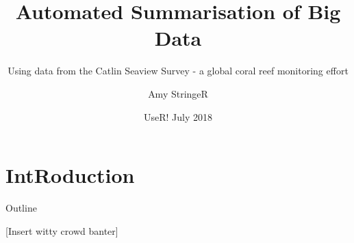\documentclass{beamer}
\title{Automated Summarisation of Big Data}
\subtitle{Using data from the Catlin Seaview Survey - a global coral reef monitoring effort}
\author{Amy StringeR}
\institute[Global Change Institute] %
{
  \inst{1}%
  University of Queensland
}
\date{UseR! July 2018}
\begin{document}
    \section{IntRoduction}
        \begin{frame}
          \titlepage
        \end{frame}

        \begin{frame}{Outline}
          \tableofcontents
        \end{frame}

        \begin{frame}
          \begin{block}{[Insert witty crowd banter]}
          \end{block}
        \end{frame}

\end{document}
